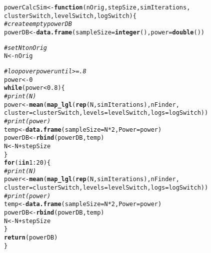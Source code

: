 \documentclass[10pt]{article}\usepackage[]{graphicx}\usepackage[]{color}
\makeatletter
\newcommand{\hlnum}[1]{\textcolor[rgb]{0.686,0.059,0.569}{#1}}%
\newcommand{\hlcom}[1]{\textcolor[rgb]{0.678,0.584,0.686}{\textit{#1}}}%
\newcommand{\hlopt}[1]{\textcolor[rgb]{0,0,0}{#1}}%
\newcommand{\hlstd}[1]{\textcolor[rgb]{0.345,0.345,0.345}{#1}}%
\newcommand{\hlkwa}[1]{\textcolor[rgb]{0.161,0.373,0.58}{\textbf{#1}}}%
\newcommand{\hlkwb}[1]{\textcolor[rgb]{0.69,0.353,0.396}{#1}}%
\newcommand{\hlkwc}[1]{\textcolor[rgb]{0.333,0.667,0.333}{#1}}%
\newcommand{\hlkwd}[1]{\textcolor[rgb]{0.737,0.353,0.396}{\textbf{#1}}}%
\newenvironment{kframe}{%
 \def\at@end@of@kframe{}%
 \ifinner\ifhmode%
  \def\at@end@of@kframe{\end{minipage}}%
  \begin{minipage}{\columnwidth}%
 \fi\fi%
 \def\FrameCommand##1{\hskip\@totalleftmargin \hskip-\fboxsep
 \colorbox{shadecolor}{##1}\hskip-\fboxsep
     \hskip-\linewidth \hskip-\@totalleftmargin \hskip\columnwidth}%
 \MakeFramed {\advance\hsize-\width
   \@totalleftmargin\z@ \linewidth\hsize
   \@setminipage}}%
 {\par\unskip\endMakeFramed%
 \at@end@of@kframe}
\newenvironment{knitrout}{}{} %
\makeatother
\begin{document}
\begin{knitrout}
\color{fgcolor}\begin{kframe}
\begin{alltt}
\hlstd{powerCalcSim} \hlkwb{<-} \hlkwa{function}\hlstd{(}\hlkwc{nOrig}\hlstd{,} \hlkwc{stepSize}\hlstd{,} \hlkwc{simIterations}\hlstd{,}
                         \hlkwc{clusterSwitch}\hlstd{,} \hlkwc{levelSwitch}\hlstd{,} \hlkwc{logSwitch}\hlstd{)\{}
  \hlcom{# create empty powerDB}
  \hlstd{powerDB} \hlkwb{<-} \hlkwd{data.frame}\hlstd{(}\hlkwc{sampleSize} \hlstd{=} \hlkwd{integer}\hlstd{(),} \hlkwc{power} \hlstd{=} \hlkwd{double}\hlstd{())}

  \hlcom{# set N to nOrig }
  \hlstd{N} \hlkwb{<-} \hlstd{nOrig}

  \hlcom{# loop over power until >=.8}
  \hlstd{power} \hlkwb{<-} \hlnum{0}
  \hlkwa{while}\hlstd{(power} \hlopt{<} \hlnum{0.8}\hlstd{)\{}
  \hlcom{#print(N)}
  \hlstd{power} \hlkwb{<-} \hlkwd{mean}\hlstd{(}\hlkwd{map_lgl}\hlstd{(}\hlkwd{rep}\hlstd{(N,simIterations),nFinder,}
                        \hlkwc{cluster} \hlstd{= clusterSwitch,} \hlkwc{levels} \hlstd{= levelSwitch,} \hlkwc{logs} \hlstd{= logSwitch))}
  \hlcom{#print(power)}
  \hlstd{temp} \hlkwb{<-} \hlkwd{data.frame}\hlstd{(}\hlkwc{sampleSize} \hlstd{= N}\hlopt{*}\hlnum{2}\hlstd{,} \hlkwc{Power} \hlstd{= power)}
  \hlstd{powerDB} \hlkwb{<-} \hlkwd{rbind}\hlstd{(powerDB, temp)}
  \hlstd{N} \hlkwb{<-} \hlstd{N} \hlopt{+} \hlstd{stepSize}
  \hlstd{\}}
  \hlkwa{for}\hlstd{(i} \hlkwa{in} \hlnum{1}\hlopt{:}\hlnum{20}\hlstd{)\{}
  \hlcom{#print(N)}
  \hlstd{power} \hlkwb{<-} \hlkwd{mean}\hlstd{(}\hlkwd{map_lgl}\hlstd{(}\hlkwd{rep}\hlstd{(N,simIterations),nFinder,}
                        \hlkwc{cluster} \hlstd{= clusterSwitch,} \hlkwc{levels} \hlstd{= levelSwitch,} \hlkwc{logs} \hlstd{= logSwitch))}
  \hlcom{#print(power)}
  \hlstd{temp} \hlkwb{<-} \hlkwd{data.frame}\hlstd{(}\hlkwc{sampleSize} \hlstd{= N}\hlopt{*}\hlnum{2}\hlstd{,} \hlkwc{Power} \hlstd{= power)}
  \hlstd{powerDB} \hlkwb{<-} \hlkwd{rbind}\hlstd{(powerDB, temp)}
  \hlstd{N} \hlkwb{<-} \hlstd{N} \hlopt{+} \hlstd{stepSize}
  \hlstd{\}}
  \hlkwd{return}\hlstd{(powerDB)}
\hlstd{\}}
\end{alltt}
\end{kframe}
\end{knitrout}
\end{document}
